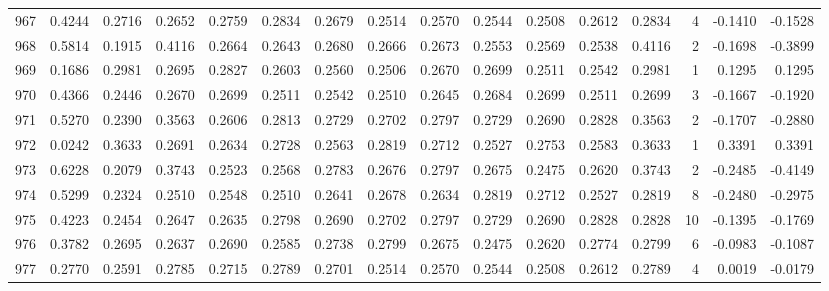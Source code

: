 \begin{tabular}{lrrrrrrrrrrrrrrr}
967 &      0.4244 &  0.2716 &  0.2652 &  0.2759 &  0.2834 &  0.2679 &  0.2514 &  0.2570 &  0.2544 &  0.2508 &   0.2612 &     0.2834 &      4 &                   -0.1410 &                    -0.1528 \\
968 &      0.5814 &  0.1915 &  0.4116 &  0.2664 &  0.2643 &  0.2680 &  0.2666 &  0.2673 &  0.2553 &  0.2569 &   0.2538 &     0.4116 &      2 &                   -0.1698 &                    -0.3899 \\
969 &      0.1686 &  0.2981 &  0.2695 &  0.2827 &  0.2603 &  0.2560 &  0.2506 &  0.2670 &  0.2699 &  0.2511 &   0.2542 &     0.2981 &      1 &                    0.1295 &                     0.1295 \\
970 &      0.4366 &  0.2446 &  0.2670 &  0.2699 &  0.2511 &  0.2542 &  0.2510 &  0.2645 &  0.2684 &  0.2699 &   0.2511 &     0.2699 &      3 &                   -0.1667 &                    -0.1920 \\
971 &      0.5270 &  0.2390 &  0.3563 &  0.2606 &  0.2813 &  0.2729 &  0.2702 &  0.2797 &  0.2729 &  0.2690 &   0.2828 &     0.3563 &      2 &                   -0.1707 &                    -0.2880 \\
972 &      0.0242 &  0.3633 &  0.2691 &  0.2634 &  0.2728 &  0.2563 &  0.2819 &  0.2712 &  0.2527 &  0.2753 &   0.2583 &     0.3633 &      1 &                    0.3391 &                     0.3391 \\
973 &      0.6228 &  0.2079 &  0.3743 &  0.2523 &  0.2568 &  0.2783 &  0.2676 &  0.2797 &  0.2675 &  0.2475 &   0.2620 &     0.3743 &      2 &                   -0.2485 &                    -0.4149 \\
974 &      0.5299 &  0.2324 &  0.2510 &  0.2548 &  0.2510 &  0.2641 &  0.2678 &  0.2634 &  0.2819 &  0.2712 &   0.2527 &     0.2819 &      8 &                   -0.2480 &                    -0.2975 \\
975 &      0.4223 &  0.2454 &  0.2647 &  0.2635 &  0.2798 &  0.2690 &  0.2702 &  0.2797 &  0.2729 &  0.2690 &   0.2828 &     0.2828 &     10 &                   -0.1395 &                    -0.1769 \\
976 &      0.3782 &  0.2695 &  0.2637 &  0.2690 &  0.2585 &  0.2738 &  0.2799 &  0.2675 &  0.2475 &  0.2620 &   0.2774 &     0.2799 &      6 &                   -0.0983 &                    -0.1087 \\
977 &      0.2770 &  0.2591 &  0.2785 &  0.2715 &  0.2789 &  0.2701 &  0.2514 &  0.2570 &  0.2544 &  0.2508 &   0.2612 &     0.2789 &      4 &                    0.0019 &                    -0.0179 \\

\end{tabular}
